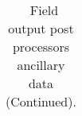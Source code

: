 \begin{table}
\begin{center}
\begin{tabular}{|c|c|c|c|c|}
\end{tabular} \end{center}
\caption{~Field output post processors ancillary data (Continued).} \label{tab:fields_part2}
\vspace{0.5in}
\end{table}

\clearpage

\bpage

